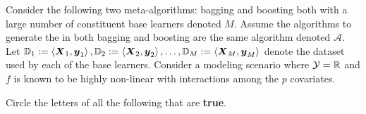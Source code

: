 \documentclass[12pt]{article}
\begin{document}
\eenum

\problem Consider the following two meta-algorithms: bagging and boosting both with a large number of constituent base learners denoted $M$. Assume the algorithms to generate the  in both bagging and boosting are the same algorithm denoted $\mathcal{A}$. Let $\mathbb{D}_1 := \left<\boldsymbol{X}_1, \boldsymbol{y}_1\right>, \mathbb{D}_2 := \left<\boldsymbol{X}_2, \boldsymbol{y}_2\right>, \ldots, \mathbb{D}_M := \left<\boldsymbol{X}_M, \boldsymbol{y}_M\right>$ denote the dataset used by each of the base learners. Consider a modeling scenario where $\mathcal{Y} = \mathbb{R}$ and $f$ is known to be highly non-linear with interactions among the $p$ covariates.

\benum  

 Circle the letters of all the following that are \textbf{true}. 
\end{document}
